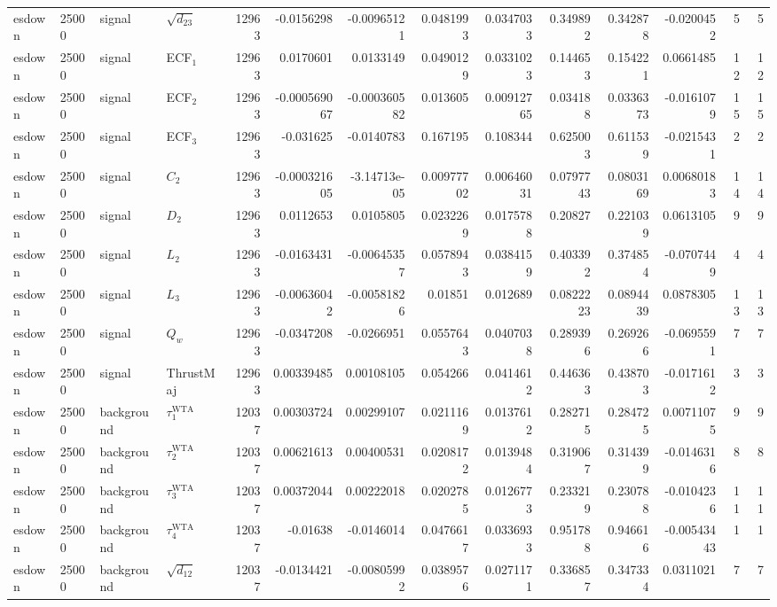 \begin{landscape}
\begin{longtable}{llll r rrrr rr r rr}
esdown & 25000 & signal & $\sqrt{d_{23}}$ & 12963 & -0.0156298 & -0.00965121 & 0.0481993 & 0.0347033 & 0.349892 & 0.342878 & -0.0200452 & 5 & 5 \\
esdown & 25000 & signal & ECF$_1$ & 12963 & 0.0170601 & 0.0133149 & 0.0490129 & 0.0331023 & 0.144653 & 0.154221 & 0.0661485 & 12 & 12 \\
esdown & 25000 & signal & ECF$_2$ & 12963 & -0.000569067 & -0.000360582 & 0.013605 & 0.00912765 & 0.034188 & 0.0336373 & -0.0161079 & 15 & 15 \\
esdown & 25000 & signal & ECF$_3$ & 12963 & -0.031625 & -0.0140783 & 0.167195 & 0.108344 & 0.625003 & 0.611539 & -0.0215431 & 2 & 2 \\
esdown & 25000 & signal & $C_2$ & 12963 & -0.000321605 & -3.14713e-05 & 0.00977702 & 0.00646031 & 0.0797743 & 0.0803169 & 0.00680183 & 14 & 14 \\
esdown & 25000 & signal & $D_2$ & 12963 & 0.0112653 & 0.0105805 & 0.0232269 & 0.0175788 & 0.20827 & 0.221039 & 0.0613105 & 9 & 9 \\
esdown & 25000 & signal & $L_2$ & 12963 & -0.0163431 & -0.00645357 & 0.0578943 & 0.0384159 & 0.403392 & 0.374854 & -0.0707449 & 4 & 4 \\
esdown & 25000 & signal & $L_3$ & 12963 & -0.00636042 & -0.00581826 & 0.01851 & 0.012689 & 0.0822223 & 0.0894439 & 0.0878305 & 13 & 13 \\
esdown & 25000 & signal & $Q_w$ & 12963 & -0.0347208 & -0.0266951 & 0.0557643 & 0.0407038 & 0.289396 & 0.269266 & -0.0695591 & 7 & 7 \\
esdown & 25000 & signal & ThrustMaj & 12963 & 0.00339485 & 0.00108105 & 0.054266 & 0.0414612 & 0.446363 & 0.438703 & -0.0171612 & 3 & 3 \\
esdown & 25000 & background & $\tau_1^{\mathrm{WTA}}$ & 12037 & 0.00303724 & 0.00299107 & 0.0211169 & 0.0137612 & 0.282715 & 0.284725 & 0.00711075 & 9 & 9 \\
esdown & 25000 & background & $\tau_2^{\mathrm{WTA}}$ & 12037 & 0.00621613 & 0.00400531 & 0.0208172 & 0.0139484 & 0.319067 & 0.314399 & -0.0146316 & 8 & 8 \\
esdown & 25000 & background & $\tau_3^{\mathrm{WTA}}$ & 12037 & 0.00372044 & 0.00222018 & 0.0202785 & 0.0126773 & 0.233219 & 0.230788 & -0.0104236 & 11 & 11 \\
esdown & 25000 & background & $\tau_4^{\mathrm{WTA}}$ & 12037 & -0.01638 & -0.0146014 & 0.0476617 & 0.0336933 & 0.951788 & 0.946616 & -0.00543443 & 1 & 1 \\
esdown & 25000 & background & $\sqrt{d_{12}}$ & 12037 & -0.0134421 & -0.00805992 & 0.0389576 & 0.0271171 & 0.336857 & 0.347334 & 0.0311021 & 7 & 7 \\

\end{longtable}
\end{landscape}

